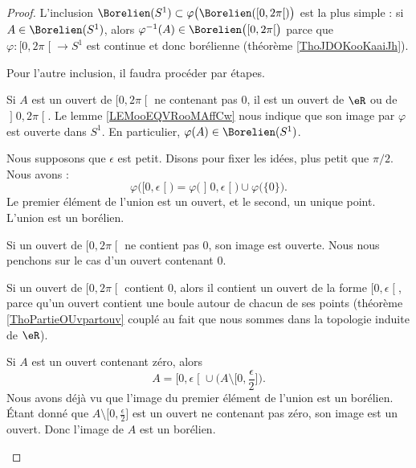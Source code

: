 \begin{proof}
	L'inclusion  \(\Borelien(S^1)\subset\varphi\big( \Borelien(\mathopen[ 0 , 2\pi \mathclose[) \big) \) est la plus simple : si \( A\in\Borelien(S^1)\), alors \( \varphi^{-1}(A)\in\Borelien\big( \mathopen[ 0 , 2\pi \mathclose[ \big)\) parce que \( \varphi\colon \mathopen[ 0 , 2\pi \mathclose[\to S^1\) est continue et donc borélienne (théorème \ref{ThoJDOKooKaaiJh}).

	Pour l'autre inclusion, il faudra procéder par étapes.
	\begin{subproof}
		Si \( A\) est un ouvert de \( \mathopen[ 0 , 2\pi \mathclose[\) ne contenant pas \( 0\), il est un ouvert de \( \eR\) ou de \( \mathopen] 0 , 2\pi \mathclose[\). Le lemme \ref{LEMooEQVRooMAffCw} nous indique que son image par \( \varphi\) est ouverte dans \( S^1\). En particulier, \( \varphi(A)\in\Borelien(S^1)\).

		Nous supposons que \( \epsilon\) est petit. Disons pour fixer les idées, plus petit que \( \pi/2\). Nous avons :
		\begin{equation}
			\varphi\big( \mathopen[ 0 , \epsilon \mathclose[ \big)=\varphi\big( \mathopen] 0 , \epsilon \mathclose[ \big)\cup\varphi\big( \{ 0 \} \big).
		\end{equation}
		Le premier élément de l'union est un ouvert, et le second, un unique point. L'union est un borélien.

		Si un ouvert de \( \mathopen[ 0 , 2\pi\mathclose[\) ne contient pas \( 0\), son image est ouverte. Nous nous penchons sur le cas d'un ouvert contenant \( 0\).

		Si un ouvert de \( \mathopen[ 0 , 2\pi \mathclose[\) contient \( 0\), alors il contient un ouvert de la forme \( \mathopen[ 0 , \epsilon \mathclose[\), parce qu'un ouvert contient une boule autour de chacun de ses points (théorème \ref{ThoPartieOUvpartouv} couplé au fait que nous sommes dans la topologie induite de \( \eR\)).

		Si \( A\) est un ouvert contenant zéro, alors
		\begin{equation}
			A=\mathopen[ 0 , \epsilon \mathclose[\cup\big( A\setminus\mathopen[ 0 , \frac{ \epsilon }{2} \mathclose] \big).
		\end{equation}
		Nous avons déjà vu que l'image du premier élément de l'union est un borélien. Étant donné que \( A\setminus \mathopen[ 0 , \frac{ \epsilon }{2} \mathclose]\) est un ouvert ne contenant pas zéro, son image est un ouvert. Donc l'image de \( A\) est un borélien.


\end{subproof}
\end{proof}
